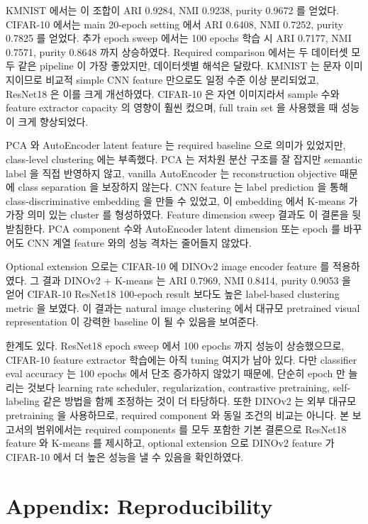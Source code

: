 \documentclass[11pt]{article}
\begin{document}
KMNIST 에서는 이 조합이 ARI 0.9284, NMI 0.9238, purity 0.9672 를 얻었다.
CIFAR-10 에서는 main 20-epoch setting 에서 ARI 0.6408, NMI 0.7252, purity 0.7825 를 얻었다.
추가 epoch sweep 에서는 100 epochs 학습 시 ARI 0.7177, NMI 0.7571, purity 0.8648 까지 상승하였다.
Required comparison 에서는 두 데이터셋 모두 같은 pipeline 이 가장 좋았지만, 데이터셋별 해석은 달랐다.
KMNIST 는 문자 이미지이므로 비교적 simple CNN feature 만으로도 일정 수준 이상 분리되었고, ResNet18 은 이를 크게 개선하였다.
CIFAR-10 은 자연 이미지라서 sample 수와 feature extractor capacity 의 영향이 훨씬 컸으며, full train set 을 사용했을 때 성능이 크게 향상되었다.

PCA 와 AutoEncoder latent feature 는 required baseline 으로 의미가 있었지만, class-level clustering 에는 부족했다.
PCA 는 저차원 분산 구조를 잘 잡지만 semantic label 을 직접 반영하지 않고, vanilla AutoEncoder 는 reconstruction objective 때문에 class separation 을 보장하지 않는다.
CNN feature 는 label prediction 을 통해 class-discriminative embedding 을 만들 수 있었고, 이 embedding 에서 K-means 가 가장 의미 있는 cluster 를 형성하였다.
Feature dimension sweep 결과도 이 결론을 뒷받침한다.
PCA component 수와 AutoEncoder latent dimension 또는 epoch 를 바꾸어도 CNN 계열 feature 와의 성능 격차는 줄어들지 않았다.

Optional extension 으로는 CIFAR-10 에 DINOv2 image encoder feature 를 적용하였다.
그 결과 DINOv2 + K-means 는 ARI 0.7969, NMI 0.8414, purity 0.9053 을 얻어 CIFAR-10 ResNet18 100-epoch result 보다도 높은 label-based clustering metric 을 보였다.
이 결과는 natural image clustering 에서 대규모 pretrained visual representation 이 강력한 baseline 이 될 수 있음을 보여준다.

한계도 있다.
ResNet18 epoch sweep 에서 100 epochs 까지 성능이 상승했으므로, CIFAR-10 feature extractor 학습에는 아직 tuning 여지가 남아 있다.
다만 classifier eval accuracy 는 100 epochs 에서 단조 증가하지 않았기 때문에, 단순히 epoch 만 늘리는 것보다 learning rate scheduler, regularization, contrastive pretraining, self-labeling 같은 방법을 함께 조정하는 것이 더 타당하다.
또한 DINOv2 는 외부 대규모 pretraining 을 사용하므로, required component 와 동일 조건의 비교는 아니다.
본 보고서의 범위에서는 required components 를 모두 포함한 기본 결론으로 ResNet18 feature 와 K-means 를 제시하고, optional extension 으로 DINOv2 feature 가 CIFAR-10 에서 더 높은 성능을 낼 수 있음을 확인하였다.

\section{Appendix: Reproducibility}
\end{document}

